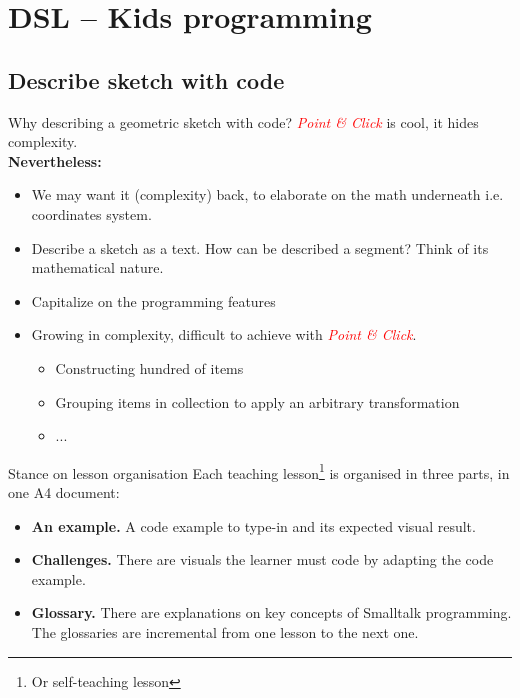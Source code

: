 \documentclass{beamer}
\begin{document}
\section{DSL -- Kids programming}
\subsection{Describe sketch with code}
\begin{frame}{Why describing a geometric sketch with code?}
  \textcolor{red}{\emph{Point \& Click}} is cool, it hides complexity.\\
  \textbf{Nevertheless:}
  \begin{itemize}
  \item We may want it (complexity) back, to elaborate on the math
    underneath i.e. coordinates system.
  \item Describe a sketch as a text. How can be described a segment?
    Think of its mathematical nature.
  \item Capitalize on the programming features
  \item Growing in complexity, difficult to achieve with
    \textcolor{red}{\emph{Point \& Click}}.
    \begin{itemize}
    \item Constructing hundred of items
    \item Grouping items in collection to apply an arbitrary
      transformation
    \item ...
    \end{itemize}
  \end{itemize}
\end{frame}
%
\begin{frame}{Stance on lesson organisation}
  Each teaching lesson\footnote[frame]{Or self-teaching lesson} is
  organised in three parts, in one A4 document:
  \begin{itemize}
  \item \textbf{An example.} A code example to type-in and its
    expected visual result.
  \item \textbf{Challenges.} There are visuals the learner must code
    by adapting the code example.
  \item \textbf{Glossary.} There are explanations on key concepts of
    Smalltalk programming. The glossaries are incremental from one
    lesson to the next one.
  \end{itemize}
\end{frame}
%
\end{document}
